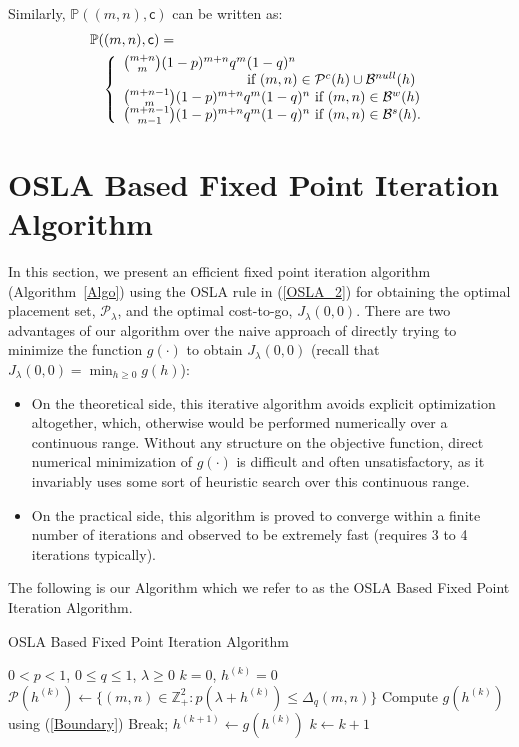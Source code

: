 \documentclass[conference]{IEEEtran}
\begin{document}
Similarly, $\mathbb P((m,n),\mathsf{c})$ can be written as:
\begin{eqnarray*}
 \lefteqn{\mathbb P((m,n),\mathsf{c})=}\\
 &&\left\{\begin{array}{ll}
 \binom{m+n}{m}(1-p)^{m+n}q^m(1-q)^n \\
\hspace{30mm}\mbox{ if } (m,n)\in \mathcal{P}^c(h)\cup \mathcal{B}^{null}(h)\\
 \binom{m+n-1}{m} (1-p)^{m+n} q^m(1-q)^n \mbox{ if }(m,n)\in \mathcal{B}^{w}(h)\\
 \binom{m+n-1}{m-1} (1-p)^{m+n} q^m(1-q)^n \mbox{ if }(m,n)\in \mathcal{B}^{s}(h).
\end{array}\right.
 \end{eqnarray*}


\section{OSLA Based Fixed Point Iteration Algorithm} 
\label{FPI_NLOS_section}
In this section, we present an efficient fixed point iteration
algorithm (Algorithm~\ref{Algo}) using the OSLA rule in (\ref{OSLA_2})
for obtaining the optimal placement set, $\mathcal{P}_\lambda$, and
the optimal cost-to-go, $J_\lambda(0,0)$. There are two advantages of
our algorithm over the naive approach of directly trying to minimize
the function $g(\cdot)$ to obtain $J_\lambda(0,0)$ (recall that
$J_\lambda(0,0)=\min_{h\ge0} g(h)$):
\begin{itemize}
\item On the theoretical side, this iterative algorithm avoids
  explicit optimization altogether, which, otherwise would be
  performed numerically over a continuous range. Without any structure
  on the objective function, direct numerical minimization of
  $g(\cdot)$ is difficult and often unsatisfactory, as it  invariably
  uses some sort of heuristic search over this continuous range.
\item On the practical side, this algorithm is proved to converge
  within a finite number of iterations and observed to be extremely
  fast (requires 3 to 4 iterations typically). 
\end{itemize}  

The following is our Algorithm which we refer to as the 
OSLA Based Fixed Point Iteration Algorithm.
\begin{algorithm} 
\caption{OSLA Based Fixed Point Iteration Algorithm}
\begin{algorithmic}[1] 
\REQUIRE $0<p<1$, $0\leq q\leq 1$, $\lambda\geq 0$
\STATE $k=0$, $h^{(k)}=0$
\STATE $\mathcal{P}(h^{(k)})\gets \{(m,n)\in \mathbb{Z}_{+}^2: p(\lambda+h^{(k)})\leq \Delta_q(m,n)\}$
\STATE Compute $g(h^{(k)})$ using (\ref{Boundary})
 \STATE Break; \ENDIF
\STATE $h^{(k+1)}\gets g(h^{(k)})$
\STATE $k\gets k+1$ 
\ENDWHILE
{}
\end{algorithmic}
\label{Algo}
\end{algorithm}
\end{document}
